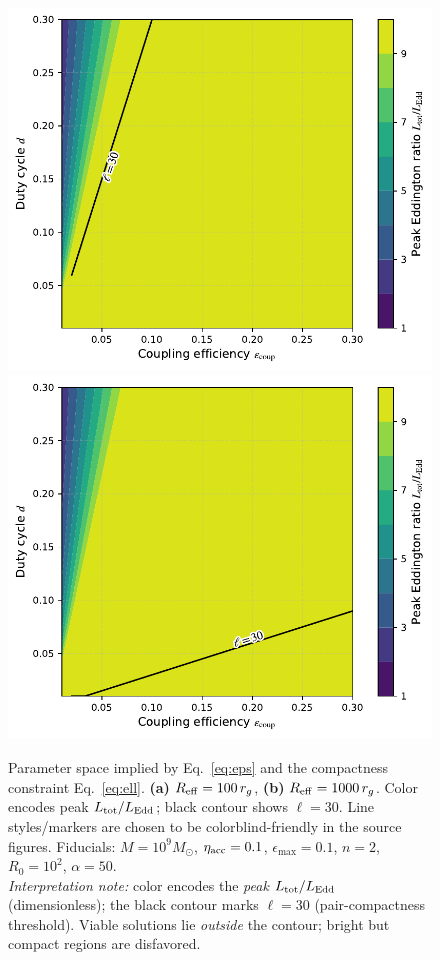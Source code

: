 \documentclass[twocolumn]{aastex701}
\newcommand{\rg}{r_g}
\newcommand{\LEdd}{L_{\rm Edd}}
\newcommand{\Ltot}{L_{\rm tot}}
\begin{document}
\begin{figure}[tbp]
  \centering
  \includegraphics[width=.92\linewidth]{fig10a_Reff100.pdf}
  \includegraphics[width=.92\linewidth]{fig10b_Reff1000.pdf}
  \caption{Parameter space implied by Eq.~\eqref{eq:eps} and the compactness constraint Eq.~\eqref{eq:ell}. \textbf{(a)} $R_{\rm eff}=100\,\rg$, \textbf{(b)} $R_{\rm eff}=1000\,\rg$. Color encodes peak $\Ltot/\LEdd$; black contour shows $\ell=30$. Line styles/markers are chosen to be colorblind-friendly in the source figures. Fiducials: $M=10^9M_\odot$, $\eta_{\rm acc}=0.1$, $\epsilon_{\max}=0.1$, $n=2$, $R_0=10^2$, $\alpha=50$.\\
  \emph{Interpretation note:} color encodes the \emph{peak} $L_{\rm tot}/L_{\rm Edd}$ (dimensionless); the black contour marks $\ell{=}30$ (pair-compactness threshold). Viable solutions lie \emph{outside} the contour; bright but compact regions are disfavored.}
  \label{fig:fig1}
\end{figure}
\end{document}
